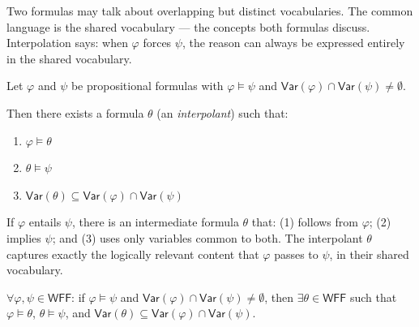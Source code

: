 \begin{remark}[Intuition]
Two formulas may talk about overlapping but distinct vocabularies. The common
language is the shared vocabulary — the concepts both formulas discuss.
Interpolation says: when $\varphi$ forces $\psi$, the reason can always be
expressed entirely in the shared vocabulary.
\end{remark}

\begin{tcolorbox}[colback=thmbox, colframe=thmborder, arc=2pt,
  left=6pt, right=6pt, top=4pt, bottom=4pt,
  title={\small\textbf{Theorem (Craig's Interpolation Theorem)}},
  fonttitle=\small\bfseries]
\label{thm:craig}
Let $\varphi$ and $\psi$ be propositional formulas with $\varphi \models \psi$
and $\mathsf{Var}(\varphi) \cap \mathsf{Var}(\psi) \neq \emptyset$.

Then there exists a formula $\theta$ (an \emph{interpolant}) such that:
\begin{enumerate}
  \item $\varphi \models \theta$
  \item $\theta \models \psi$
  \item $\mathsf{Var}(\theta) \subseteq \mathsf{Var}(\varphi) \cap \mathsf{Var}(\psi)$
\end{enumerate}
\end{tcolorbox}

\begin{remark}
If $\varphi$ entails $\psi$, there is an intermediate formula $\theta$ that:
(1) follows from $\varphi$; (2) implies $\psi$; and (3) uses only variables
common to both. The interpolant $\theta$ captures exactly the logically relevant
content that $\varphi$ passes to $\psi$, in their shared vocabulary.
\end{remark}

\begin{remark}
$\forall \varphi, \psi \in \mathsf{WFF}$:
if $\varphi \models \psi$ and $\mathsf{Var}(\varphi)\cap\mathsf{Var}(\psi)\neq\emptyset$,
then $\exists \theta \in \mathsf{WFF}$ such that
$\varphi\models\theta$, $\theta\models\psi$, and
$\mathsf{Var}(\theta)\subseteq\mathsf{Var}(\varphi)\cap\mathsf{Var}(\psi)$.
\end{remark}

